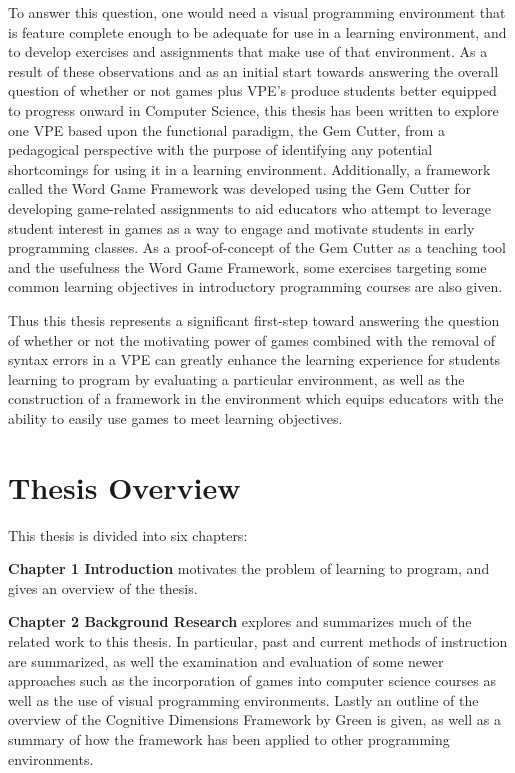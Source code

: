 To answer this question, one would need a visual programming environment that is feature complete enough to be adequate for use in a learning environment, and to develop exercises and assignments that make use of that environment.  As a result of these observations and as an initial start towards answering the overall question of whether or not games plus VPE's produce students better equipped to progress onward in Computer Science, this thesis has been written to explore one VPE based upon the functional paradigm, the Gem Cutter, from a pedagogical perspective with the purpose of identifying any potential shortcomings for using it in a learning environment.  Additionally, a framework called the Word Game Framework was developed using the Gem Cutter for developing game-related assignments to aid educators who attempt to leverage student interest in games as a way to engage and motivate students in early programming classes.  As a proof-of-concept of the Gem Cutter as a teaching tool and the usefulness the Word Game Framework, some exercises targeting some common learning objectives in introductory programming courses are also given.

Thus this thesis represents a significant first-step toward answering the question of whether or not the motivating power of games combined with the removal of syntax errors in a VPE can greatly enhance the learning experience for students learning to program by evaluating a particular environment, as well as the construction of a framework in the environment which equips educators with the ability to easily use games to meet learning objectives.

\section{Thesis Overview}

This thesis is divided into six chapters:  


\textbf{Chapter 1 Introduction} motivates the problem of learning to program, and gives an overview of the thesis.


\textbf{Chapter 2 Background Research} explores and summarizes much of the related work to this thesis.  In particular, past and current methods of instruction are summarized, as well the examination and evaluation of some newer approaches such as the incorporation of games into computer science courses as well as the use of visual programming environments.  Lastly an outline of the overview of the Cognitive Dimensions Framework by Green is given, as well as a summary of how the framework has been applied to other programming environments.

